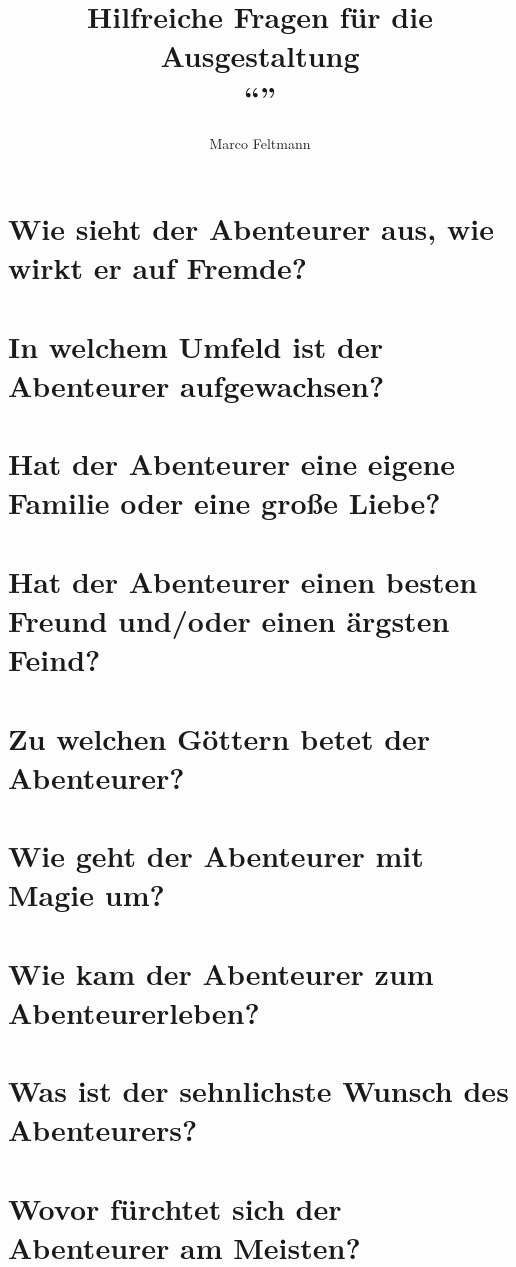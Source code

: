 \documentclass{article}
\author{Marco Feltmann}
\title{Hilfreiche Fragen für die Ausgestaltung \\ \enquote{\charactername} }
\begin{document}
	\maketitle
	
	\tableofcontents
	
	\section[Aussehen]{Wie sieht der Abenteurer aus, wie wirkt er auf Fremde?}
	
	\section[Soziales Umfeld]{In welchem Umfeld ist der Abenteurer aufgewachsen?}
	
	\section[Beziehungsstatus]{Hat der Abenteurer eine eigene Familie oder eine große Liebe?}

	\section[Freund und Feind]{Hat der Abenteurer einen besten Freund und/oder einen ärgsten Feind?}

	\section[Religion]{Zu welchen Göttern betet der Abenteurer?}
	
	\section[Magie]{Wie geht der Abenteurer mit Magie um?}

	\section[Schicksal]{Wie kam der Abenteurer zum Abenteurerleben?}

	\section[Antrieb]{Was ist der sehnlichste Wunsch des Abenteurers?}

	\section[Ängste]{Wovor fürchtet sich der Abenteurer am Meisten?}
\end{document}
